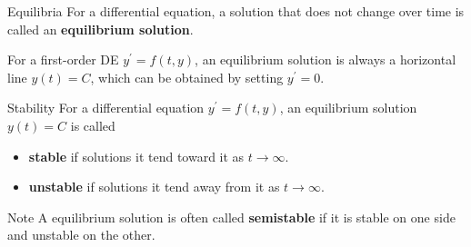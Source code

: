 \documentclass{beamer}
\begin{document}
\begin{frame}[fragile]
\begin{block}{Equilibria}
For a differential equation, a solution that does not change over time is called an \textbf{equilibrium solution}.\pause

\vspace{2mm}
For a first-order DE $y^{\prime}=f(t,y)$, an equilibrium solution is always a horizontal line $y(t)=C$, which can be obtained by setting $y^{\prime}=0$.
\end{block}\pause

\begin{block}{Stability}
For a differential equation $y^\prime=f(t,y)$, an equilibrium solution $y(t)=C$ is called
\begin{itemize}[<+- | alert@+>]
\item \textbf{stable} if solutions  it tend toward it as $t\rightarrow\infty$.
\item \textbf{unstable} if solutions  it tend away from it as $t\rightarrow\infty$.
\end{itemize}
\end{block}

\onslide<+->
\begin{block}{Note}
A equilibrium solution is often called \textbf{semistable} if it is stable on one side and unstable on the other.
\end{block}
\end{frame}
\end{document}

